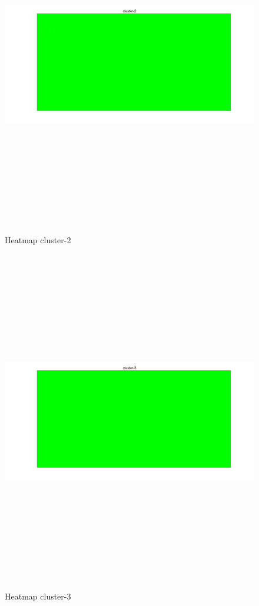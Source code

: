 \begin{figure}[htbp]
	\centering
	\includegraphics[width=\linewidth,height=15cm,keepaspectratio]{analisis/cluster-2.jpg}
	\caption{Heatmap cluster-2}
	\label{pic:cluster-2}
\end{figure}

\begin{figure}[htbp]
	\centering
	\includegraphics[width=\linewidth,height=15cm,keepaspectratio]{analisis/cluster-3.jpg}
	\caption{Heatmap cluster-3}
	\label{pic:cluster-3}
\end{figure}

